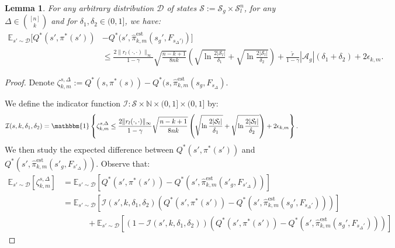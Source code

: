 \documentclass{article}
\theoremstyle{plain}
\newtheorem{lemma}[theorem]{Lemma}
\theoremstyle{definition}
\def\est{\mathrm{est}}
\def\E{\mathbb{E}}
\begin{document}
\begin{lemma}\label{lemma: expected_q*bound_with_different_actions}
For any arbitrary distribution $\mathcal{D}$ of states $\mathcal{S} := \mathcal{S}_g\times\mathcal{S}_l^n$, for any $\Delta\in\binom{[n]}{k}$ and for $\delta_1,\delta_2 \in (0,1]$, we have:
\begin{align*}\E_{s'\sim \mathcal{D}}[Q^*(s',\pi^*(s')) &- Q^*(s',\hat{\pi}^{\est}_{k,m}(s_g',F_{s_\Delta')})] \\
&\leq \frac{2\|r_l(\cdot,\cdot)\|_\infty}{1-\gamma}\sqrt{\frac{n-k+1}{8nk}}\left(\sqrt{\ln \frac{2|\mathcal{S}_l|}{\delta_1}} + \sqrt{\ln \frac{2|\mathcal{S}_l|}{\delta_2}}\right) +  \frac{\tilde{r}}{1-\gamma}|\mathcal{A}_g|(\delta_1 + \delta_2) + 2\epsilon_{k,m}.
\end{align*}
\end{lemma}
\begin{proof}
Denote $\zeta_{k,m}^{s,\Delta}:=Q^*(s,\pi^*(s)) - Q^*(s, \hat{\pi}_{k,m}^\est(s_g,F_{s_\Delta})$.


We define the indicator function $\mathcal{I}:\mathcal{S}\times \mathbb{N} \times (0,1]\times(0,1]$ by:
\[\mathcal{I}(s, k, \delta_1,\delta_2)=\mathbbm{1}\left\{\zeta_{k,m}^{s,\Delta}\leq\frac{2\|r_l(\cdot,\cdot)\|_\infty}{1-\gamma}\sqrt{\frac{n-k+1}{8nk}}\left(\sqrt{\ln\frac{2|\mathcal{S}_l|}{\delta_1}}+ \sqrt{\ln\frac{2|\mathcal{S}_l|}{\delta_2}}\right)+ 2\epsilon_{k,m}\right\}.\]
We then study the expected difference between $Q^*(s',\pi^*(s'))$ and $Q^*(s',\hat{\pi}_{k,m}^{\est}(s'_g,F_{s'_\Delta}))$. Observe that:
\begin{align*}
\E_{s'\sim \mathcal{D}}[\zeta_{k,m}^{s,\Delta}] &= \E_{s'\sim \mathcal{D}}[Q^*(s',\pi^*(s')) - {Q}^*(s', \hat{\pi}_{k,m}^{\est}(s'_g,F_{s'_\Delta}))] \\
    &= \E_{s'\sim \mathcal{D}}\left[\mathcal{I}(s',k,\delta_1,\delta_2)(Q^*(s',\pi^*(s')) - Q^*(s',\hat{\pi}^{\est}_{k,m}(s_g',F_{s_\Delta'})))\right] \\
    &\quad\quad\quad + \E_{s'\sim \mathcal{D}}[(1-\mathcal{I}(s',k,\delta_1,\delta_2))(Q^*(s',\pi^*(s')) - Q^*(s',\hat{\pi}^{\est}_{k,m}(s_g',F_{s_\Delta'})))]
\end{align*}


\end{proof}
\end{document}
